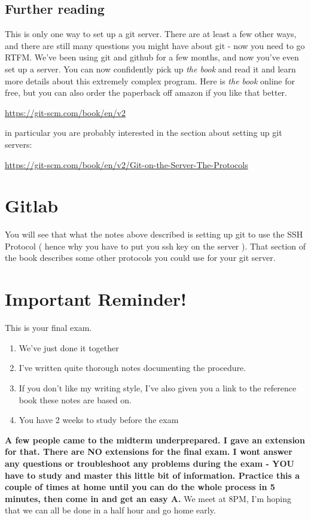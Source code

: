 \documentclass[10pt]{article}
\begin{document}
\subsection{Further reading}
This is only one way to set up a git server. There are at least a few other
ways, and there are still many questions you might have about git - now you need
to go RTFM. We've been using git and github for a few months, and now you've
even set up a server. You can now confidently pick up \textit{the book} and read
it and learn more details about this extremely complex program. Here is
\textit{the book} online for free, but you can also order the paperback off
amazon if you like that better.

\begin{center}
\url{https://git-scm.com/book/en/v2}
\end{center}

in particular you are probably interested in the section about setting up git
servers:

\begin{center}
\url{https://git-scm.com/book/en/v2/Git-on-the-Server-The-Protocols}
\end{center}
\section{Gitlab}

You will see that what the notes above described is setting up git to use the
SSH Protocol ( hence why you have to put you ssh key on the server ). That
section of the book describes some other protocols you could use for your git
server.

\section{Important Reminder!}
This is your final exam. 

\begin{enumerate}
\item We've just done it together
\item I've written quite thorough notes documenting the procedure.
\item If you don't like my writing style, I've also given you a link to the
 reference book these notes are based on. 
\item You have 2 weeks to study before the exam
\end{enumerate}

{\LARGE\textbf{A few people came to the midterm underprepared. I gave an
extension for that. There are NO extensions for the final exam. I wont answer
any questions or troubleshoot any problems during the exam - YOU have to study
and master this little bit of information. Practice this a
couple of times at home until you can do the whole process in 5 minutes, then
come in and get an easy A.} We meet at 8PM, I'm hoping that we can all be done
in a half hour and go home early.}
\end{document}
